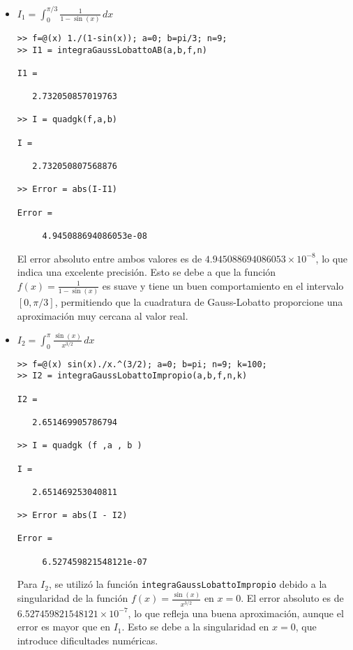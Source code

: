 \documentclass[a4paper]{article}
\begin{document}
\begin{itemize}
    \item $\displaystyle I_1=\int_{0}^{\pi/3} \! \frac{1}{1-\sin(x)}  \,dx$
    \\
\begin{lstlisting}[frame=single, style=Matlab-Pyglike]
>> f=@(x) 1./(1-sin(x)); a=0; b=pi/3; n=9;
>> I1 = integraGaussLobattoAB(a,b,f,n)

I1 =

   2.732050857019763

>> I = quadgk(f,a,b)

I =

   2.732050807568876

>> Error = abs(I-I1)

Error =

     4.945088694086053e-08
\end{lstlisting}

El error absoluto entre ambos valores es de \(4.945088694086053 \times 10^{-8} \), lo que indica una excelente precisión. Esto se debe a que la función \( f(x) = \frac{1}{1-\sin(x)} \) es suave y tiene un buen comportamiento en el intervalo \( [0, \pi/3] \), permitiendo que la cuadratura de Gauss-Lobatto proporcione una aproximación muy cercana al valor real.

    \item $\displaystyle I_2=\int_{0}^{\pi} \! \frac{\sin(x)}{x^{3/2}}  \,dx$
    \\
\begin{lstlisting}[frame=single, style=Matlab-Pyglike]
>> f=@(x) sin(x)./x.^(3/2); a=0; b=pi; n=9; k=100;
>> I2 = integraGaussLobattoImpropio(a,b,f,n,k)

I2 =

   2.651469905786794

>> I = quadgk (f ,a , b )

I =

   2.651469253040811

>> Error = abs(I - I2)

Error =

     6.527459821548121e-07
\end{lstlisting}

Para \( I_2 \), se utilizó la función \texttt{integraGaussLobattoImpropio}  debido a la singularidad de la función \( f(x) = \frac{\sin(x)}{x^{3/2}} \) en \( x = 0 \).  El error absoluto es de \( 6.527459821548121 \times 10^{-7} \), lo que refleja una buena aproximación, aunque el error es mayor que en \( I_1 \). Esto se debe a la singularidad en \( x = 0 \), que introduce dificultades numéricas.


\end{itemize}
\end{document}
